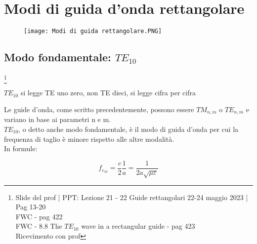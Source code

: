 \chapter{Modi di guida d'onda rettangolare} 

\begin{figure}[h]
    \centering
    \texttt{[image: Modi di guida rettangolare.PNG]}
\end{figure}  

\newpage 

\section{Modo fondamentale: $TE_{10}$}

\footnote{Slide del prof | PPT: Lezione 21 - 22 Guide rettangolari 22-24 maggio 2023 | Pag 13-20 \\ 
FWC - pag 422 \\
FWC - 8.8 The $TE_{10}$ wave in a rectangular guide - pag 423 \\
Ricevimento con prof}

\begin{tcolorbox}
    $TE_{10}$ si legge TE uno zero, non TE dieci, si legge cifra per cifra
\end{tcolorbox}

Le guide d'onda, come scritto precedentemente, possono essere $TM_{n, m}$ o $TE_{n, m}$ e variano in base ai parametri n e m. \\ 

$TE_{10}$, o detto anche modo fondamentale, è il modo di guida d'onda per cui la frequenza di taglio è minore rispetto alle altre modalità. \\ 

In formule: 

{
    \Large 
    \begin{equation}
        f_{c_{10}} = \frac{c}{2} \frac{1}{a} = \frac{1}{2 a \sqrt{\mu \varepsilon}}
    \end{equation} 
}

